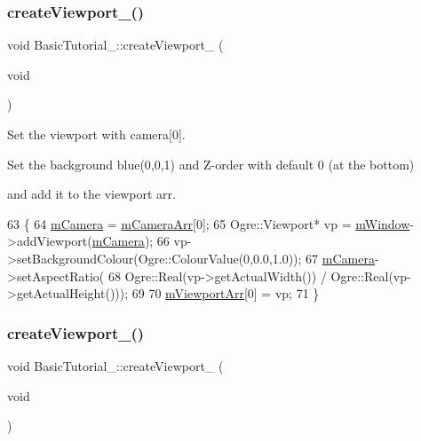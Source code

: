 \subsubsection{\texorpdfstring{create\+Viewport\+\_()}{createViewport\_00()}}
{\footnotesize\ttfamily void Basic\+Tutorial\+\_\+::create\+Viewport\+\_ (\begin{DoxyParamCaption}\item[{void}]{ }\end{DoxyParamCaption})\hspace{0.3cm}{\ttfamily [protected]}}



Set the viewport with camera\mbox{[}0\mbox{]}. 

Set the background blue(0,0,1) and Z-\/order with default 0 (at the bottom)

and add it to the viewport arr. 
\begin{DoxyCode}
63 \{
64     \hyperlink{class_base_application_a3829c6b12afe911e97e6b4524b33a38b}{mCamera} = \hyperlink{class_basic_tutorial__00_af8d457d912286a98c0975c52d4faf910}{mCameraArr}[0];
65     Ogre::Viewport* vp = \hyperlink{class_base_application_ac5d8e9c81e036897bc82f81eff8c570f}{mWindow}->addViewport(\hyperlink{class_base_application_a3829c6b12afe911e97e6b4524b33a38b}{mCamera});
66     vp->setBackgroundColour(Ogre::ColourValue(0,0.0,1.0));
67     \hyperlink{class_base_application_a3829c6b12afe911e97e6b4524b33a38b}{mCamera}->setAspectRatio(
68         Ogre::Real(vp->getActualWidth()) / Ogre::Real(vp->getActualHeight()));
69 
70     \hyperlink{class_basic_tutorial__00_a6676a92b50e9b43634d4c66488537b73}{mViewportArr}[0] = vp;
71 \}
\end{DoxyCode}
\mbox{\label{class_basic_tutorial__00_a2801a2f0d91d80b471da48344d2ccccf}} 
\subsubsection{\texorpdfstring{create\+Viewport\+\_()}{createViewport\_01()}}
{\footnotesize\ttfamily void Basic\+Tutorial\+\_\+::create\+Viewport\+\_ (\begin{DoxyParamCaption}\item[{void}]{ }\end{DoxyParamCaption})\hspace{0.3cm}{\ttfamily [protected]}}



